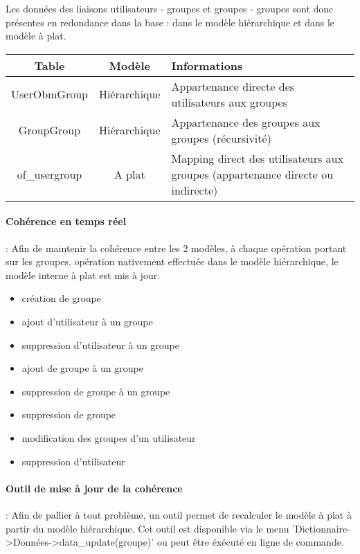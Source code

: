 Les données des liaisons utilisateurs - groupes et groupes - groupes sont donc présentes en redondance dans la base : dans le modèle hiérarchique et dans le modèle à plat.\\

\begin{tabular}{|c|c|p{9cm}|}
\hline
\textbf{Table} & \textbf{Modèle} & \textbf{Informations} \\
\hline
UserObmGroup & Hiérarchique & Appartenance directe des utilisateurs aux groupes\\
\hline
GroupGroup & Hiérarchique & Appartenance des groupes aux groupes (récursivité)\\
\hline
of\_usergroup & A plat & Mapping direct des utilisateurs aux groupes (appartenance directe ou indirecte)\\
\hline
\end{tabular}
\vspace{0.3cm}

\paragraph{Cohérence en temps réel} : Afin de maintenir la cohérence entre les 2 modèles, à chaque opération portant sur les groupes, opération nativement effectuée dans le modèle hiérarchique, le modèle interne à plat est mis à jour.

\begin{itemize}
\item création de groupe
\item ajout d'utilisateur à un groupe
\item suppression d'utilisateur à un groupe
\item ajout de groupe à un groupe
\item suppression de groupe à un groupe
\item suppression de groupe
\item modification des groupes d'un utilisateur
\item suppression d'utilisateur
\end{itemize}


\paragraph{Outil de mise à jour de la cohérence} : Afin de pallier à tout problème, un outil permet de recalculer le modèle à plat à partir du modèle hiérarchique.
Cet outil est disponible via le menu 'Dictionnaire->Données->data\_update(groupe)' ou peut être éxécuté en ligne de commande.

